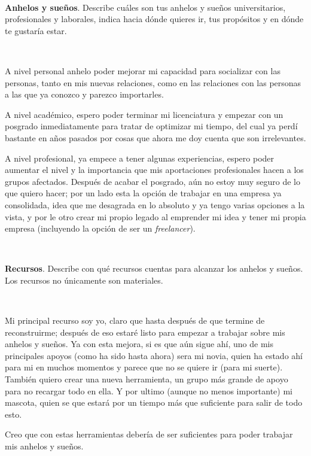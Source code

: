 \documentclass[12pt]{article}
\begin{document}
\par \ \\
\par 
\noindent \textbf{Anhelos y sueños}. Describe cuáles son tus anhelos y sueños universitarios, profesionales y laborales, indica hacia dónde quieres ir, tus propósitos y en dónde te gustaría estar.
\par \
	\par A nivel personal anhelo poder mejorar mi capacidad para socializar con las personas, tanto en mis nuevas relaciones, como en las relaciones con las personas a las que ya conozco y parezco importarles. 
	\par A nivel académico, espero poder terminar mi licenciatura y empezar con un posgrado inmediatamente para tratar de optimizar mi tiempo, del cual ya perdí bastante en años pasados por cosas que ahora me doy cuenta que son irrelevantes. 
	\par A nivel profesional, ya empece a tener algunas experiencias, espero poder aumentar el nivel y la importancia que mis aportaciones profesionales hacen a los grupos afectados. Después de acabar el posgrado, aún no estoy muy seguro de lo que quiero hacer; por un lado esta la opción de trabajar en una empresa ya consolidada, idea que me desagrada en lo absoluto y ya tengo varias opciones a la vista, y por le otro crear mi propio legado al emprender mi idea y tener mi propia empresa (incluyendo la opción de ser un \textit{freelancer}).


\par \ \\
\par 
\par \textbf{Recursos}. Describe con qué recursos cuentas para alcanzar los anhelos y
sueños. Los recursos no únicamente son materiales.
\par \
	\par Mi principal recurso soy yo, claro que hasta después de que termine de reconstruirme; después de eso estaré listo para empezar a trabajar sobre mis anhelos y sueños. Ya con esta mejora, si es que aún sigue ahí, uno de mis principales apoyos (como ha sido hasta ahora) sera mi novia, quien ha estado ahí para mi en muchos momentos y parece que no se quiere ir (para mi suerte). También quiero crear una nueva herramienta, un grupo más grande de apoyo para no recargar todo en ella. Y por ultimo (aunque no menos importante) mi mascota, quien se que estará por un tiempo más que suficiente para salir de todo esto.
	\par Creo que con estas herramientas debería de ser suficientes para poder trabajar mis anhelos y sueños.
\end{document}

